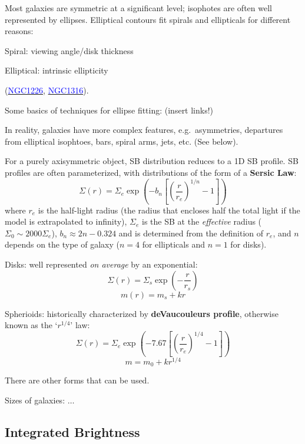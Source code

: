 \documentclass[12pt]{article}
\begin{document}
Most galaxies are symmetric at a significant level;
isophotes are often well represented by ellipses.
Elliptical contours fit spirals and ellipticals for different reasons:
\begin{itemize*}
    \item Spiral: viewing angle/disk thickness
    \item Elliptical: intrinsic ellipticity
\end{itemize*}
(\href{http://astronomy.nmsu.edu/holtz/a555/resources/n1226.h.jpg}
{\textcolor{blue}{NGC1226}},
\href{http://astronomy.nmsu.edu/holtz/a555/resources/n1316.h.jpg}
{\textcolor{blue}{NGC1316}}).

Some basics of techniques for ellipse fitting: (insert links!)

In reality, galaxies have more complex features, e.g.\ asymmetries,
departures from elliptical isophtoes, bars, spiral arms, jets, etc.
(See below).

For a purely axisymmetric object, SB distribution reduces to a 1D SB profile.
SB profiles are often parameterized, with distributions of the form
of a \textbf{Sersic Law}:
$$ \Sigma(r) = \Sigma_e\exp\left(-b_n\left[\left(
\frac{r}{r_e}\right)^{1/n}-1\right]\right) $$
where $r_e$ is the half-light radius (the radius that encloses half the
total light if the model is extrapolated to infinity),
$\Sigma_e$ is the SB at the \emph{effective} radius
($\Sigma_0 \sim 2000\Sigma_e$),
$b_n \approx 2n - 0.324$ and is determined from the definition of $r_e$,
and $n$ depends on the type of galaxy
($n=4$ for ellipticals and $n=1$ for disks).
\begin{itemize*}
    \item Disks: well represented \emph{on average} by an exponential:
        $$ \Sigma(r) = \Sigma_s\exp\left(-\frac{r}{r_s}\right) $$
        $$ m(r) = m_s + kr $$
    \item Spherioids: historically characterized by
        \textbf{deVaucouleurs profile}, otherwise known as the
        `$r^{1/4}$' law:
        $$ \Sigma(r) = \Sigma_e\exp\left(-7.67\left[\left(
            \frac{r}{r_e}\right)^{1/4}-1\right] \right)$$
        $$ m = m_0 + kr^{1/4}$$
\end{itemize*}
There are other forms that can be used.

Sizes of galaxies:
$\ldots$

\subsection*{Integrated Brightness}
\end{document}
